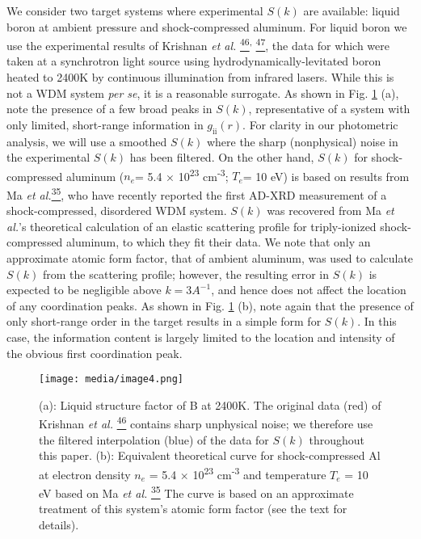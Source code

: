 We consider two target systems where experimental \(S(k)\) are
available: liquid boron at ambient pressure and shock-compressed
aluminum. For liquid boron we use the experimental results of Krishnan
\emph{et al.}
\hyperref[s.-krishnan-s.-ansell-j.-j.-felten-k.-j.-volin-and-d.-l.-price-physical-review-letters-81-586-1998.]{\textsuperscript{46}}\textsuperscript{,}
\hyperref[s.-krishnan-and-d.-l.-price-journal-of-physics-condensed-matter-12-r145-2000.]{\textsuperscript{47}},
the data for which were taken at a synchrotron light source using
hydrodynamically-levitated boron heated to 2400K by continuous
illumination from infrared lasers. While this is not a WDM system
\emph{per se}, it is a reasonable surrogate. As shown in Fig. \ref{edimage4} (a),
note the presence of a few broad peaks in \(S(k)\), representative of a
system with only limited, short-range information in
\(g_{\text{ii}}\left( r \right)\). For clarity in our photometric
analysis, we will use a smoothed \(S(k)\) where the sharp (nonphysical)
noise in the experimental \(S(k)\) has been filtered. On the other hand,
\(S(k)\) for shock-compressed aluminum (\(n_{e}\)= 5.4 ×
10\textsuperscript{23} cm\textsuperscript{-3}; \(T_{e}\)= 10 eV) is
based on results from Ma \emph{et
al.}\hyperref[t.-ma-et-al.-physical-review-letters-110-065001-2013.]{\textsuperscript{35}},
who have recently reported the first AD-XRD measurement of a
shock-compressed, disordered WDM system. \(S(k)\) was recovered from Ma
\emph{et al.}'s theoretical calculation of an elastic scattering profile
for triply-ionized shock-compressed aluminum, to which they fit their
data. We note that only an approximate atomic form factor, that of
ambient aluminum, was used to calculate \(S(k)\) from the scattering
profile; however, the resulting error in \(S(k)\) is expected to be
negligible above \(k = 3A^{- 1}\), and hence does not affect the
location of any coordination peaks. As shown in Fig. \ref{edimage4} (b), note again
that the presence of only short-range order in the target results in a
simple form for \(S(k)\). In this case, the information content is
largely limited to the location and intensity of the obvious first
coordination peak.


\begin{figure}[h] \label{edimage4}
\caption{ (a): Liquid structure factor of B at 2400K. The original data
(red) of Krishnan \emph{et al.}
\hyperref[s.-krishnan-s.-ansell-j.-j.-felten-k.-j.-volin-and-d.-l.-price-physical-review-letters-81-586-1998.]{\textsuperscript{46}}
contains sharp unphysical noise; we therefore use the filtered
interpolation (blue) of the data for \(S(k)\) throughout this paper.
(b): Equivalent theoretical curve for shock-compressed Al at electron
density \(n_{e}\) = 5.4 × 10\textsuperscript{23} cm\textsuperscript{-3}
and temperature \(T_{e}\) = 10 eV based on Ma \emph{et al.}
\hyperref[t.-ma-et-al.-physical-review-letters-110-065001-2013.]{\textsuperscript{35}}
The curve is based on an approximate treatment of this system's atomic
form factor (see the text for details).}
\centering
\texttt{[image: media/image4.png]}
\end{figure}

